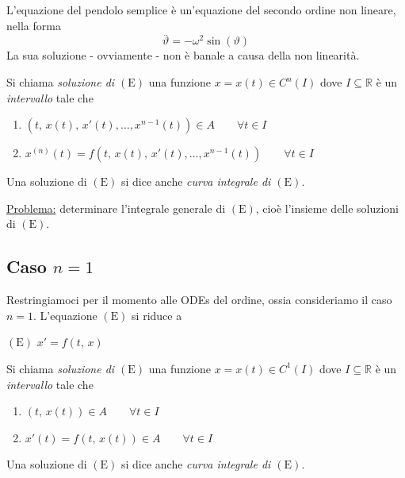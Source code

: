 \begin{example}
L'equazione del pendolo semplice è un'equazione del secondo ordine non lineare, nella forma
$$
\overset{..}{\vartheta} = - \omega^2 \sin(\vartheta)
$$
La sua soluzione - ovviamente - non è banale a causa della non linearità.
\end{example}

\begin{definition}
Si chiama \emph{soluzione di $\mathrm{(E)}$} una funzione $x = x(t) \in C^n(I)$ dove $I \subseteq \mathbb{R}$ è un \emph{intervallo} tale che
\begin{enumerate}[labelindent=\parindent,leftmargin=*,label=\textnormal{(S$_\arabic*$)},start=1]
\item $\left( t,\,x(t),\,x'(t),\ldots,x^{n-1}(t) \right) \in A \qquad \forall t \in I$
\item $x^{(n)}(t) = f \left( t,\,x(t),\,x'(t),\ldots,x^{n-1}(t) \right) \qquad \forall t \in I$
\end{enumerate}
Una soluzione di $\mathrm{(E)}$ si dice anche \emph{curva integrale di $\mathrm{(E)}$}.
\end{definition}

\noindent\underline{Problema:} determinare l'integrale generale di $\mathrm{(E)}$, cioè l'insieme delle soluzioni di $\mathrm{(E)}$.

\subsection{Caso $n=1$}
Restringiamoci per il momento alle ODEs del  ordine, ossia consideriamo il caso $n=1$. L'equazione $\mathrm{(E)}$ si riduce a
\begin{center}
$\mathrm{(E)}$
\hfill
$\displaystyle
x' = f \left( t,\,x \right)
$
\hfill \null \\
\end{center}

\begin{definition}[di soluzione di $\mathrm{(E)}$ per $n=1$]
Si chiama \emph{soluzione di $\mathrm{(E)}$} una funzione $x = x(t) \in C^1(I)$ dove $I \subseteq \mathbb{R}$ è un \emph{intervallo} tale che
\begin{enumerate}[labelindent=\parindent,leftmargin=*,label=\textnormal{(S$_\arabic*$)},start=1]
\item $\left( t,\,x(t) \right) \in A \qquad \forall t \in I$
\item $x'(t) = f \left( t,\,x(t) \right) \in A \qquad \forall t \in I$
\end{enumerate}
Una soluzione di $\mathrm{(E)}$ si dice anche \emph{curva integrale di $\mathrm{(E)}$}.
\end{definition}

